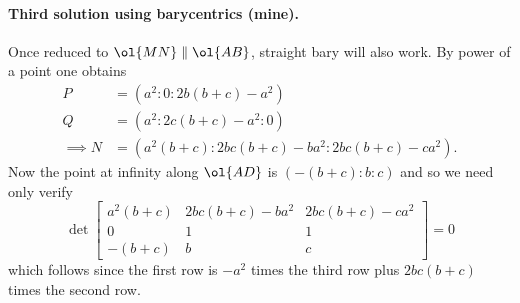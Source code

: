 \documentclass[11pt]{scrartcl}
\begin{document}
\paragraph{Third solution using barycentrics (mine).}
Once reduced to $\ol{MN} \parallel \ol{AB}$,
straight bary will also work.
By power of a point one obtains
\begin{align*}
  P &= \left( a^2 : 0 : 2b(b+c)-a^2 \right) \\
  Q &= \left( a^2 : 2c(b+c)-a^2 : 0 \right) \\
  \implies N &= \left( a^2(b+c) : 2bc(b+c) - ba^2 : 2bc(b+c)-ca^2 \right).
\end{align*}
Now the point at infinity along $\ol{AD}$ is $(-(b+c):b:c)$
and so we need only verify
\[
  \det \begin{bmatrix}
    a^2(b+c) & 2bc(b+c) - ba^2 & 2bc(b+c)-ca^2 \\
    0 & 1 & 1 \\
    -(b+c) & b & c
  \end{bmatrix}
  = 0
\]
which follows since the first row is $-a^2$
times the third row plus $2bc(b+c)$ times the second row.
\pagebreak
\end{document}
